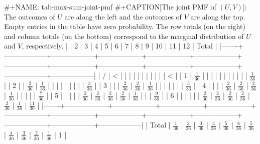 #+NAME: tab-max-sum-joint-pmf
#+CAPTION[The joint PMF of \((U,V)\)]: The outcomes of \(U\) are along the left and the outcomes of \(V\) are along the top. Empty entries in the table have zero probability. The row totals (on the right) and column totals (on the bottom) correspond to the marginal distribution of \(U\) and \(V\), respectively.
|       | 2                | 3                | 4                | 5                | 6                | 7                | 8                | 9                | 10               | 11               | 12               | Total            |
|-------+------------------+------------------+------------------+------------------+------------------+------------------+------------------+------------------+------------------+------------------+------------------+------------------|
|     / | <                |                  |                  |                  |                  |                  |                  |                  |                  |                  |                  | <                |
|     1 | \(\frac{1}{36}\) |                  |                  |                  |                  |                  |                  |                  |                  |                  |                  | \(\frac{1}{36}\) |
|     2 |                  | \(\frac{2}{36}\) | \(\frac{1}{36}\) |                  |                  |                  |                  |                  |                  |                  |                  | \(\frac{3}{36}\)  |
|     3 |                  |                  | \(\frac{2}{36}\) | \(\frac{2}{36}\) | \(\frac{1}{36}\) |                  |                  |                  |                  |                  |                  | \(\frac{5}{36}\)  |
|     4 |                  |                  |                  | \(\frac{2}{36}\) | \(\frac{2}{36}\) | \(\frac{2}{36}\) | \(\frac{1}{36}\) |                  |                  |                  |                  | \(\frac{7}{36}\)  |
|     5 |                  |                  |                  |                  | \(\frac{2}{36}\) | \(\frac{2}{36}\) | \(\frac{2}{36}\) | \(\frac{2}{36}\) | \(\frac{1}{36}\) |                  |                  | \(\frac{9}{36}\)  |
|     6 |                  |                  |                  |                  |                  | \(\frac{2}{36}\) | \(\frac{2}{36}\) | \(\frac{2}{36}\) | \(\frac{2}{36}\) | \(\frac{2}{36}\) | \(\frac{1}{36}\) | \(\frac{11}{36}\) |
|-------+------------------+------------------+------------------+------------------+------------------+------------------+------------------+------------------+------------------+------------------+------------------+------------------|
| Total | \(\frac{1}{36}\) | \(\frac{2}{36}\) | \(\frac{3}{36}\)  | \(\frac{4}{36}\)  | \(\frac{5}{36}\)  | \(\frac{6}{36}\)  | \(\frac{5}{36}\)  | \(\frac{4}{36}\)  | \(\frac{3}{36}\)  | \(\frac{2}{36}\) | \(\frac{1}{36}\) | 1                |

